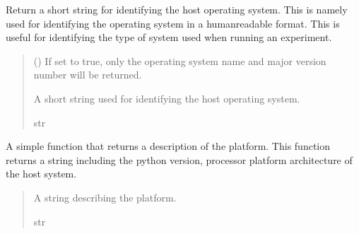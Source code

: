 \documentclass[letterpaper,10pt,english]{sphinxmanual}
\begin{document}
\begin{fulllineitems}
\label{\detokenize{modules/util/system:qnav.util.system.get_system_name}}
\pysigstartsignatures
{}
\pysigstopsignatures
\sphinxAtStartPar
Return a short string for identifying the host operating system. This is
namely used for identifying the operating system in a human\sphinxhyphen{}readable
format. This is useful for identifying the type of system used when
running an experiment.
\begin{quote}\begin{description}
\sphinxAtStartPar
{} () \textendash{} If set to true, only the operating system name
and major version number will be returned.

\sphinxAtStartPar
A short string used for identifying the host operating system.

\sphinxAtStartPar
str

\end{description}\end{quote}

\end{fulllineitems}


\begin{fulllineitems}
\label{\detokenize{modules/util/system:qnav.util.system.get_platform_details}}
\pysigstartsignatures
{}
\pysigstopsignatures
\sphinxAtStartPar
A simple function that returns a description of the platform.
This function returns a string including the python version, processor
platform architecture of the host system.
\begin{quote}\begin{description}
\sphinxAtStartPar
A string describing the platform.

\sphinxAtStartPar
str

\end{description}\end{quote}

\end{fulllineitems}
\end{document}
